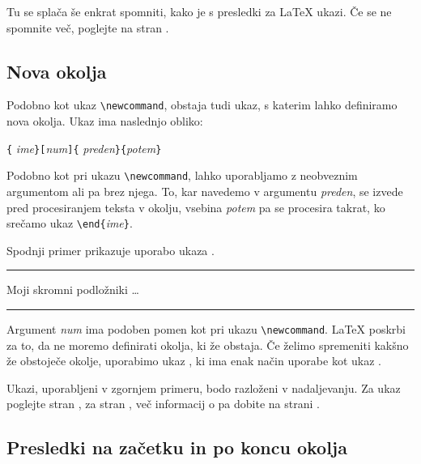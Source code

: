 Tu se splača še enkrat spomniti, kako je s presledki za \LaTeX{} ukazi. Če se ne spomnite več, poglejte
na stran \pageref{whitespace}.


\subsection{Nova okolja}
Podobno kot ukaz \verb|\newcommand|, obstaja tudi ukaz, s katerim lahko definiramo 
nova okolja. Ukaz  ima naslednjo obliko:

\begin{lscommand}
\verb|{|%
       \emph{ime}\verb|}[|\emph{num}\verb|]{|%
       \emph{preden}\verb|}{|\emph{potem}\verb|}|
\end{lscommand}

Podobno kot pri ukazu \verb|\newcommand|, lahko  uporabljamo  z neobveznim argumentom
ali pa brez njega. To, kar navedemo v argumentu
\emph{preden}, se izvede pred procesiranjem teksta v okolju, vsebina \emph{potem} pa se procesira takrat,
ko srečamo ukaz \verb|\end{|\emph{ime}\verb|}|.

Spodnji primer prikazuje uporabo ukaza . 
\begin{example}
\newenvironment{kralj}
 {\rule{1ex}{1ex}%
      \hspace{\stretch{1}}}
 {%
      \rule{1ex}{1ex}}

\begin{kralj} 
Moji skromni podložniki \ldots
\end{kralj}
\end{example}

Argument \emph{num} ima podoben pomen kot pri ukazu \verb|\newcommand|. 
\LaTeX{} poskrbi za to, da ne moremo definirati okolja, ki že obstaja. Če želimo spremeniti
kakšno že obstoječe okolje, uporabimo ukaz , ki ima enak način uporabe kot 
ukaz .

Ukazi, uporabljeni v zgornjem primeru, bodo razloženi v nadaljevanju.
Za ukaz  poglejte stran \pageref{sec:rule}, za  stran \pageref{cmd:stretch},
več informacij o  pa dobite na strani \pageref{sec:hspace}.

\subsection{Presledki na začetku in po koncu okolja}

